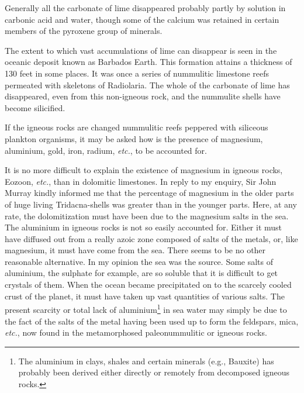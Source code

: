 \documentclass[a4paper, 12pt, oneside]{article}
\begin{document}
Generally all the carbonate of lime disappeared probably partly by solution in carbonic acid and water, though some of the calcium was retained in certain members of the pyroxene group of minerals.

The extent to which vast accumulations of lime can disappear is seen in the oceanic deposit known as Barbados Earth. This formation attains a thickness of 130 feet in some places. It was once a series of nummulitic limestone reefs permeated with skeletons of Radiolaria. The whole of the carbonate of lime has disappeared, even from this non-igneous rock, and the nummulite shells have become silicified.

If the igneous rocks are changed nummulitic reefs peppered with siliceous plankton organisms, it may be asked how is the presence of magnesium, aluminium, gold, iron, radium, \emph{etc.}, to be accounted for.

It is no more difficult to explain the existence of magnesium in igneous rocks, Eozoon, \emph{etc.}, than in dolomitic limestones. In reply to my enquiry, Sir John Murray kindly informed me that the percentage of magnesium in the older parts of huge living Tridacna-shells was greater than in the younger parts. Here, at any rate, the dolomitization must have been due to the magnesium salts in the sea. The aluminium in igneous rocks is not so easily accounted for. Either it must have diffused out from a really azoic zone composed of salts of the metals, or, like magnesium, it must have come from the sea. There seems to be no other reasonable alternative. In my opinion the sea was the source. Some salts of aluminium, the sulphate for example, are so soluble that it is difficult to get crystals of them. When the ocean became precipitated on to the scarcely cooled crust of the planet, it must have taken up vast quantities of various salts. The present scarcity or total lack of aluminium\footnote{The aluminium in clays, shales and certain minerals (e.g., Bauxite) has probably been derived either directly or remotely from decomposed igneous rocks.} in sea water may simply be due to the fact of the salts of the metal having been used up to form the feldspars, mica, \emph{etc.}, now found in the metamorphosed paleonummulitic or igneous rocks.
\end{document}
